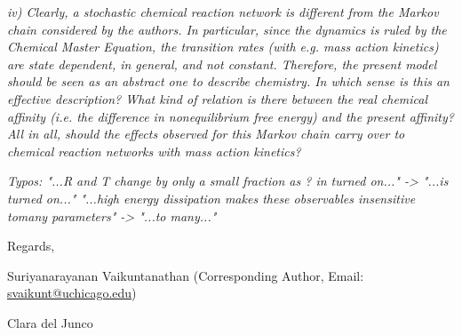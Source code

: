 \documentclass[amsmath, preprintnumbers, 12pt, onecolumn, pre, longbibliograpy]{revtex4-1}
\begin{document}
\textit{iv) Clearly, a stochastic chemical reaction network is different from the Markov chain considered by the authors. In particular, since the dynamics is ruled by the Chemical Master Equation, the transition rates (with e.g. mass action kinetics) are state dependent, in general, and not constant.
Therefore, the present model should be seen as an abstract one to describe chemistry. In which sense is this an effective description? What kind of relation is there between the real chemical affinity (i.e. the difference in nonequilibrium free energy) and the present affinity?
All in all, should the effects observed for this Markov chain carry over to chemical reaction networks with mass action kinetics?}


\textit{Typos:
"...R and T change by only a small fraction as ? in turned on..." -> "...is turned on..."
"...high energy dissipation makes these observables insensitive tomany parameters" -> "...to many..."}



\vspace{2cm}
\noindent Regards,
\vspace{1cm}

\noindent Suriyanarayanan Vaikuntanathan (Corresponding Author, Email: \href{mailto:svaikunt@uchicago.edu}{svaikunt@uchicago.edu})

\noindent Clara del Junco


%
\end{document}
